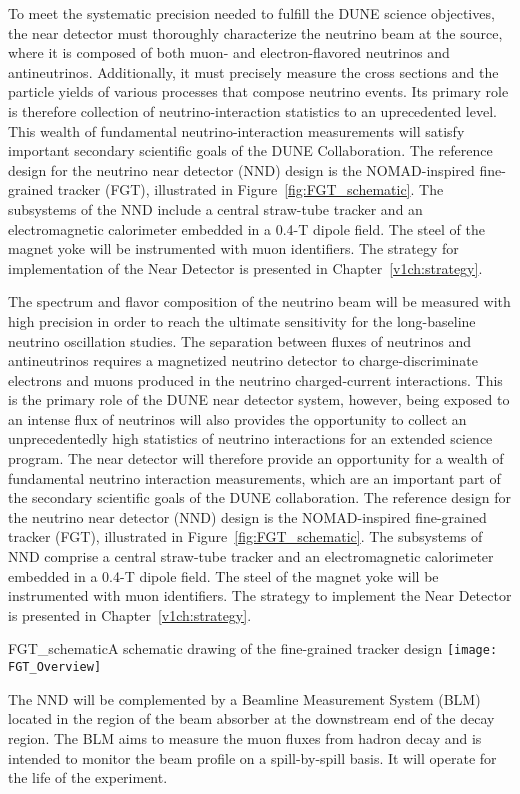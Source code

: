 To meet the systematic precision needed to fulfill the DUNE science objectives, the near detector must thoroughly 
characterize the neutrino beam at the source, where it is composed of both muon- and electron-flavored neutrinos and antineutrinos.   Additionally, it must precisely measure the cross sections and the particle yields of various processes that compose neutrino events.
Its primary role is therefore collection of neutrino-interaction statistics to an uprecedented level. This wealth of fundamental neutrino-interaction 
measurements will satisfy important secondary scientific goals of the DUNE Collaboration. 
%
The reference design for the neutrino near detector (NND) design is the NOMAD-inspired fine-grained tracker (FGT), illustrated in Figure~\ref{fig:FGT_schematic}. The subsystems of the NND include a central 
straw-tube tracker and an electromagnetic calorimeter embedded in a 0.4-T dipole field. The steel of the
magnet yoke will be instrumented with muon identifiers. The strategy for implementation of
the Near Detector  is presented in Chapter~\ref{v1ch:strategy}.

The spectrum and flavor composition of the neutrino beam will be measured with high precision 
in order to reach the ultimate sensitivity for the long-baseline neutrino oscillation studies.
The separation between fluxes of neutrinos and antineutrinos requires a magnetized neutrino detector to 
charge-discriminate electrons and muons produced in the neutrino charged-current interactions.
This is the primary role of the DUNE near detector system, however, being exposed to an intense flux of neutrinos
will also provides the opportunity to collect an unprecedentedly high statistics of neutrino 
interactions  for an extended science program. 
The near detector will therefore provide an opportunity for a wealth of fundamental neutrino interaction 
measurements, which are an important part of the secondary scientific goals of the DUNE collaboration. 
The reference design for the neutrino near detector (NND) design is the NOMAD-inspired fine-grained tracker (FGT), illustrated in Figure~\ref{fig:FGT_schematic}. The subsystems of NND comprise a central 
straw-tube tracker and an electromagnetic calorimeter embedded in a 0.4-T dipole field. The steel of the
magnet yoke will be instrumented with muon identifiers. The strategy to implement
the Near Detector is presented in Chapter~\ref{v1ch:strategy}.


\begin{cdrfigure}{FGT_schematic}{A schematic drawing of the fine-grained tracker design}
\texttt{[image: FGT\_Overview]}
\end{cdrfigure}


The NND will be complemented by a Beamline Measurement System (BLM) located in the region of the beam absorber at the downstream end of the decay region. The BLM aims to measure the muon fluxes from hadron decay and
 is intended to monitor the beam profile on a spill-by-spill basis. It will operate for the life of the experiment.



